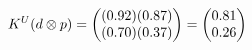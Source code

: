 \documentclass[preview]{standalone}
\begin{document}
\begin{align*}
\special{dvisvgm:raw <g id='unique000'>}K^U(d \otimes p) = \begin{pmatrix} (0.92)(0.87) \\ (0.70)(0.37) \end{pmatrix} = \begin{pmatrix} 0.81 \\ 0.26 \end{pmatrix}\special{dvisvgm:raw </g>}
\end{align*}
\end{document}
